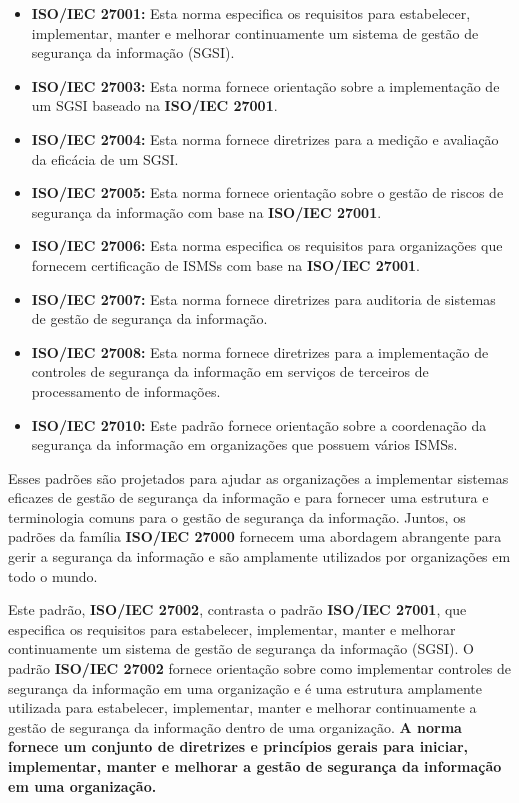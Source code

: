 \begin{itemize}
  \item \textbf{ISO/IEC 27001:} Esta norma especifica os requisitos para estabelecer, implementar, manter e melhorar continuamente um sistema de gestão de segurança da informação (SGSI).
  \item \textbf{ISO/IEC 27003:} Esta norma fornece orientação sobre a implementação de um SGSI baseado na \textbf{ISO/IEC 27001}.
  \item \textbf{ISO/IEC 27004:} Esta norma fornece diretrizes para a medição e avaliação da eficácia de um SGSI.
  \item \textbf{ISO/IEC 27005:} Esta norma fornece orientação sobre o gestão de riscos de segurança da informação com base na \textbf{ISO/IEC 27001}.
  \item \textbf{ISO/IEC 27006:} Esta norma especifica os requisitos para organizações que fornecem certificação de ISMSs com base na \textbf{ISO/IEC 27001}.
  \item \textbf{ISO/IEC 27007:} Esta norma fornece diretrizes para auditoria de sistemas de gestão de segurança da informação.
  \item \textbf{ISO/IEC 27008:} Esta norma fornece diretrizes para a implementação de controles de segurança da informação em serviços de terceiros de processamento de informações.
  \item \textbf{ISO/IEC 27010:} Este padrão fornece orientação sobre a coordenação da segurança da informação em organizações que possuem vários ISMSs.
\end{itemize}

Esses padrões são projetados para ajudar as organizações a implementar sistemas eficazes de gestão de segurança da informação e para fornecer uma estrutura e terminologia comuns para o gestão de segurança da informação. Juntos, os padrões da família \textbf{ISO/IEC 27000} fornecem uma abordagem abrangente para gerir a segurança da informação e são amplamente utilizados por organizações em todo o mundo.

Este padrão, \textbf{ISO/IEC 27002}, contrasta o padrão \textbf{ISO/IEC 27001}, que especifica os requisitos para estabelecer, implementar, manter e melhorar continuamente um sistema de gestão de segurança da informação (SGSI). O padrão \textbf{ISO/IEC 27002} fornece orientação sobre como implementar controles de segurança da informação em uma organização e é uma estrutura amplamente utilizada para estabelecer, implementar, manter e melhorar continuamente a gestão de segurança da informação dentro de uma organização. \textbf{A norma fornece um conjunto de diretrizes e princípios gerais para iniciar, implementar, manter e melhorar a gestão de segurança da informação em uma organização.}


